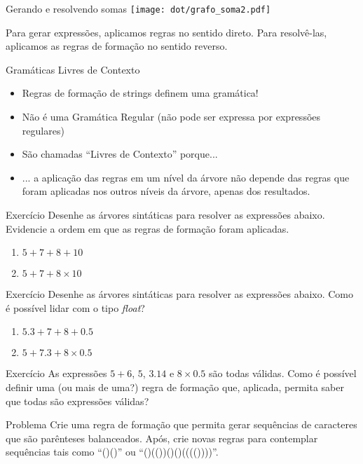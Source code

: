 \documentclass{beamer}
\begin{document}
\begin{frame}{Gerando e resolvendo somas}
\large
\centering
  \texttt{[image: dot/grafo\_soma2.pdf]}

Para gerar expressões, aplicamos regras no sentido direto. Para resolvê-las,
  aplicamos as regras de formação no sentido reverso.
\end{frame}

\begin{frame}{Gramáticas Livres de Contexto}
\large
\centering
  \begin{itemize}
  \item Regras de formação de strings definem uma gramática!
  \item Não é uma Gramática Regular (não pode ser expressa por expressões
    regulares)
  \item São chamadas ``Livres de Contexto'' porque...
  \item <2-> ... a aplicação das regras em um nível da árvore não depende das
    regras que foram aplicadas nos outros níveis da árvore, apenas dos
      resultados.
  \end{itemize}
\end{frame}



\begin{frame}{Exercício}
\Large
\centering
Desenhe as árvores sintáticas para resolver as expressões abaixo. Evidencie a
  ordem em que as regras de formação foram aplicadas.
  \begin{enumerate}
    \item $5 + 7 + 8 + 10$
    \item $5 + 7 + 8 \times 10$
  \end{enumerate}
\end{frame}

\begin{frame}{Exercício}
\Large
\centering
Desenhe as árvores sintáticas para resolver as expressões abaixo. Como é
  possível lidar com o tipo \textit{float}?
  \begin{enumerate}
    \item $5.3 + 7 + 8 + 0.5$
    \item $5 + 7.3 + 8 \times 0.5$
  \end{enumerate}
\end{frame}

\begin{frame}{Exercício}
\Large
\centering
As expressões $5 + 6$, $5$, $3.14$ e $8 \times 0.5$ são todas válidas. Como é
  possível definir uma (ou mais de uma?) regra de formação que, aplicada,
  permita saber que todas são expressões válidas?
\end{frame}


\begin{frame}{Problema}
\Large
\centering
Crie uma regra de formação que permita gerar sequências de caracteres que são
  parênteses balanceados. Após, crie novas regras para contemplar sequências
  tais como ``()()'' ou ``()(())()()(((())))''.
\end{frame}
\end{document}
